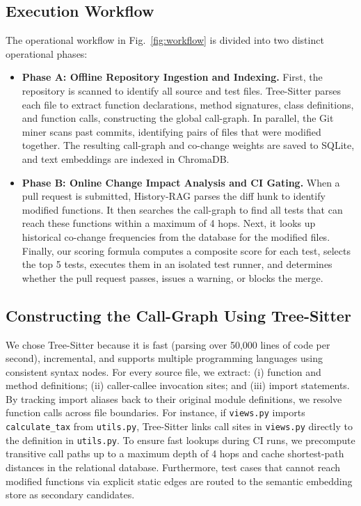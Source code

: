 \documentclass[12pt,onecolumn,draftclsnofoot]{IEEEtran}
\begin{document}
\subsection{Execution Workflow}
The operational workflow in Fig.~\ref{fig:workflow} is divided into two distinct operational phases:
\begin{itemize}
    \item \textbf{Phase A: Offline Repository Ingestion and Indexing.} First, the repository is scanned to identify all source and test files. Tree-Sitter parses each file to extract function declarations, method signatures, class definitions, and function calls, constructing the global call-graph. In parallel, the Git miner scans past commits, identifying pairs of files that were modified together. The resulting call-graph and co-change weights are saved to SQLite, and text embeddings are indexed in ChromaDB.
    \item \textbf{Phase B: Online Change Impact Analysis and CI Gating.} When a pull request is submitted, History-RAG parses the diff hunk to identify modified functions. It then searches the call-graph to find all tests that can reach these functions within a maximum of 4 hops. Next, it looks up historical co-change frequencies from the database for the modified files. Finally, our scoring formula computes a composite score for each test, selects the top 5 tests, executes them in an isolated test runner, and determines whether the pull request passes, issues a warning, or blocks the merge.
\end{itemize}

\subsection{Constructing the Call-Graph Using Tree-Sitter}
We chose Tree-Sitter because it is fast (parsing over 50,000 lines of code per second), incremental, and supports multiple programming languages using consistent syntax nodes. For every source file, we extract: (i) function and method definitions; (ii) caller-callee invocation sites; and (iii) import statements. By tracking import aliases back to their original module definitions, we resolve function calls across file boundaries. For instance, if \texttt{views.py} imports \texttt{calculate\_tax} from \texttt{utils.py}, Tree-Sitter links call sites in \texttt{views.py} directly to the definition in \texttt{utils.py}. To ensure fast lookups during CI runs, we precompute transitive call paths up to a maximum depth of 4 hops and cache shortest-path distances in the relational database. Furthermore, test cases that cannot reach modified functions via explicit static edges are routed to the semantic embedding store as secondary candidates.
\end{document}
